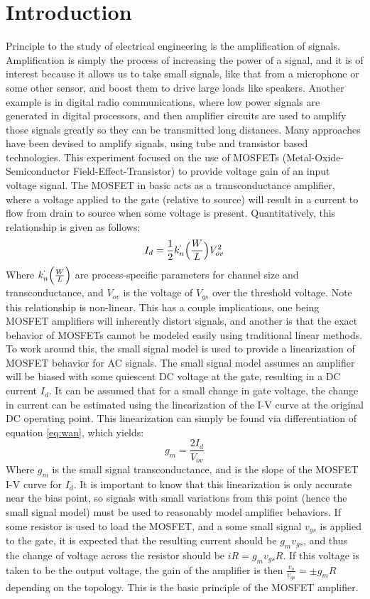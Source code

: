 \documentclass[12pt]{article}
\begin{document}
\section{Introduction}
%
Principle to the study of electrical engineering is the amplification of signals. Amplification is simply the process of increasing the power of a signal, and it is of interest because it allows us to take small signals, like that from a microphone or some other sensor, and boost them to drive large loads like speakers. Another example is in digital radio communications, where low power signals are generated in digital processors, and then amplifier circuits are used to amplify those signals greatly so they can be transmitted long distances. Many approaches have been devised to amplify signals, using tube and transistor based technologies. This experiment focused on the use of MOSFETs (Metal-Oxide-Semiconductor Field-Effect-Transistor) to provide voltage gain of an input voltage signal. The MOSFET in basic acts as a transconductance amplifier, where a voltage applied to the gate (relative to source) will result in a current to flow from drain to source when some voltage is present. Quantitatively, this relationship is given as follows:
\begin{equation}
I_d = \frac{1}{2} k_n^`\Big(\frac{W}{L}\Big)V_{ov}^2
\label{eq:wan}
\end{equation}
Where $k_n^`\Big(\frac{W}{L}\Big)$ are process-specific parameters for channel size and transconductance, and $V_{ov}$ is the voltage of $V_{gs}$ over the threshold voltage. Note this relationship is non-linear. This has a couple implications, one being MOSFET amplifiers will inherently distort signals, and another is that the exact behavior of MOSFETs cannot be modeled easily using traditional linear methods. To work around this, the small signal model is used to provide a linearization of MOSFET behavior for AC signals. The small signal model assumes an amplifier will be biased with some quiescent DC voltage at the gate, resulting in a DC current $I_d$. It can be assumed that for a small change in gate voltage, the change in current can be estimated using the linearization of the I-V curve at the original DC operating point. This linearization can simply be found via differentiation of equation \ref{eq:wan}, which yields:
\begin{equation}
g_m = \frac{2I_d}{V_{ov}}
\end{equation}
Where $g_m$ is the small signal transconductance, and is the slope of the MOSFET I-V curve for $I_d$. It is important to know that this linearization is only accurate near the bias point, so  signals with small variations from this point (hence the small signal model) must be used to reasonably model amplifier behaviors. If some resistor is used to load the MOSFET, and a some small signal $v_{gs}$ is applied to the gate, it is expected that the resulting current should be $g_mv_{gs}$, and thus the change of voltage across the resistor should be $iR = g_mv_{gs}R$. If this voltage is taken to be the output voltage, the gain of the amplifier is then $\frac{v_o}{v_{gs}}=\pm g_mR$ depending on the topology. This is the basic principle of the MOSFET amplifier.\\\par
\end{document}
